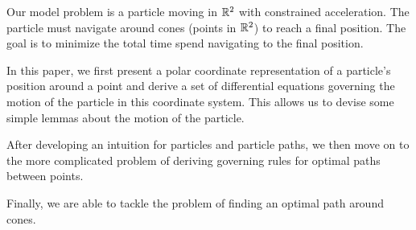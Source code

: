 Our model problem is a particle moving in $\mathbb R^2$ with constrained acceleration. The particle must navigate around cones (points in $\mathbb R^2$) to reach a final position. The goal is to minimize the total time spend navigating to the final position. 

In this paper, we first present a polar coordinate representation of a particle's position around a point and derive a set of differential equations governing the motion of the particle in this coordinate system. This allows us to devise some simple lemmas about the motion of the particle.

After developing an intuition for particles and particle paths, we then move on to the more complicated problem of deriving governing rules for optimal paths between points. 

Finally, we are able to tackle the problem of finding an optimal path around cones.
